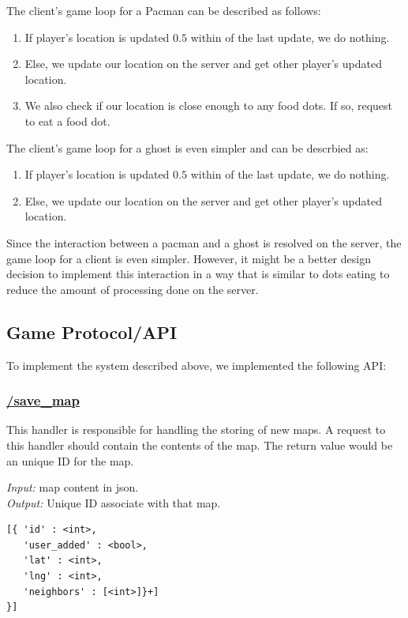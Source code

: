 \documentclass{acm_proc_article-sp}
\begin{document}
The client's game loop for a Pacman can be described as follows:

\begin{enumerate}
\item If player's location is updated $0.5$ within of the last update, we do nothing.
\item Else, we update our location on the server and get other player's updated location.
\item We also check if our location is close enough to any food dots. If so, request to eat a food dot.
\end{enumerate}

The client's game loop for a ghost is even simpler and can be descrbied as:

\begin{enumerate}
\item If player's location is updated $0.5$ within of the last update, we do nothing.
\item Else, we update our location on the server and get other player's updated location.
\end{enumerate}

Since the interaction between a pacman and a ghost is resolved on the
server, the game loop for a client is even simpler. However, it might
be a better design decision to implement this interaction in a way
that is similar to dots eating to reduce the amount of processing done
on the server.

\subsection{Game Protocol/API}
To implement the system described above, we implemented the following API:

\subsubsection{\url{/save_map}}
This handler is responsible for handling the storing of new maps. A
request to this handler should contain the contents of the map. The
return value would be an unique ID for the map.

\emph{Input:} map content in json.\\
\emph{Output:} Unique ID associate with that map.

\medskip
\begin{lstlisting}[caption=Map format in json,label={lst:MapFormat}]
[{ 'id' : <int>,
   'user_added' : <bool>,
   'lat' : <int>,
   'lng' : <int>,
   'neighbors' : [<int>]}+]
}]
\end{lstlisting}
\end{document}
